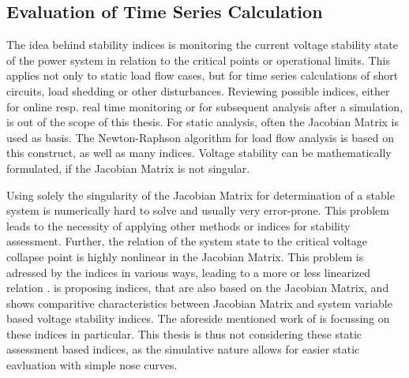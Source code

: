 \subsection{Evaluation of Time Series Calculation}
\label{sec:stability-indices}

The idea behind stability indices is monitoring the current voltage stability state of the power system in relation to the critical points or operational limits.
This applies not only to static load flow cases, but for time series calculations of short circuits, load shedding or other disturbances.
Reviewing possible indices, either for online resp. real time monitoring or for subsequent analysis after a simulation, is out of the scope of this thesis.
For static analysis, often the Jacobian Matrix is used as basis.
The Newton-Raphson algorithm for load flow analysis is based on this construct, as well as many indices.
Voltage stability can be mathematically formulated, if the Jacobian Matrix is not singular.


Using solely the singularity of the Jacobian Matrix for determination of a stable system is numerically hard to solve and usually very error-prone.
This problem leads to the necessity of applying other methods or indices for stability assessment. 
Further, the relation of the system state to the critical voltage collapse point is highly nonlinear in the Jacobian Matrix. 
This problem is adressed by the indices in various ways, leading to a more or less linearized relation \autocite{machowski_2020,danish_2015}. 
\textcite{danish_2015} is proposing indices, that are also based on the Jacobian Matrix, and shows comparitive characteristics between Jacobian Matrix and system variable based voltage stability indices. 
The aforeside mentioned work of \textcite{doigcardet_2010} is focussing on these indices in particular.
This thesis is thus not considering these static assessment based indices, as the simulative nature allows for easier static eavluation with simple nose curves. 

